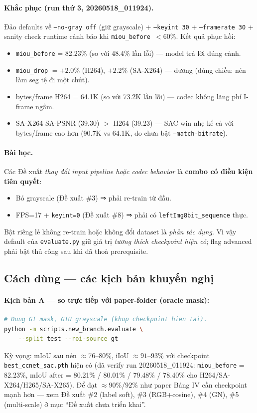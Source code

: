 \documentclass[12pt,a4paper]{article}
\begin{document}
\paragraph{Khắc phục (run thứ 3, 20260518\_011924).} Đảo defaults về
\texttt{--no-gray off} (giữ grayscale) + \texttt{--keyint 30} +
\texttt{--framerate 30} + sanity check runtime cảnh báo khi
\texttt{miou\_before $< 60\%$}. Kết quả phục hồi:
\begin{itemize}[leftmargin=2em]
  \item \texttt{miou\_before} = 82.23\% (so với 48.4\% lần lỗi) — model trả lời
        đúng cảnh.
  \item \texttt{miou\_drop} $= +2.0\%$ (H264), $+2.2\%$ (SA-X264) — dương
        (đúng chiều: nén làm seg tệ đi một chút).
  \item bytes/frame H264 = 64.1K (so với 73.2K lần lỗi) — codec không lãng phí
        I-frame ngầm.
  \item SA-X264 SA-PSNR (39.30) $>$ H264 (39.23) — SAC win nhẹ kể cả với
        bytes/frame cao hơn (90.7K vs 64.1K, do chưa bật
        \texttt{--match-bitrate}).
\end{itemize}

\paragraph{Bài học.} Các Đề xuất \emph{thay đổi input pipeline hoặc codec
behavior} là \textbf{combo có điều kiện tiên quyết}:
\begin{itemize}[leftmargin=2em]
  \item Bỏ grayscale (Đề xuất \#3) ⇒ phải re-train từ đầu.
  \item FPS=17 + \texttt{keyint=0} (Đề xuất \#8) ⇒ phải có
        \texttt{leftImg8bit\_sequence} thực.
\end{itemize}
Bật riêng lẻ không re-train hoặc không đổi dataset là \emph{phản tác dụng}. Vì
vậy default của \texttt{evaluate.py} giữ giá trị \emph{tương thích checkpoint
hiện có}; flag advanced phải bật thủ công sau khi đã thoả prerequisite.

\subsection{Cách dùng — các kịch bản khuyến nghị}

\paragraph{Kịch bản A — so trực tiếp với paper-folder (oracle mask):}
\begin{lstlisting}[language=bash]
# Dung GT mask, GIU grayscale (khop checkpoint hien tai).
python -m scripts.new_branch.evaluate \
    --split test --roi-source gt
\end{lstlisting}
Kỳ vọng: mIoU sau nén $\approx 76$--$80$\%, iIoU $\approx 91$--$93$\% với checkpoint
\texttt{best\_ccnet\_sac.pth} hiện có (đã verify run 20260518\_011924: \texttt{miou\_before}
= 82.23\%, mIoU after = 80.21\% / 80.01\% / 79.48\% / 78.40\% cho H264/SA-X264/H265/SA-X265).
Để đạt $\approx 90\%$/$92\%$ như paper Bảng IV cần checkpoint mạnh hơn — xem Đề
xuất \#2 (label soft), \#3 (RGB+cosine), \#4 (GN), \#5 (multi-scale) ở mục
``Đề xuất chưa triển khai''.
\end{document}
